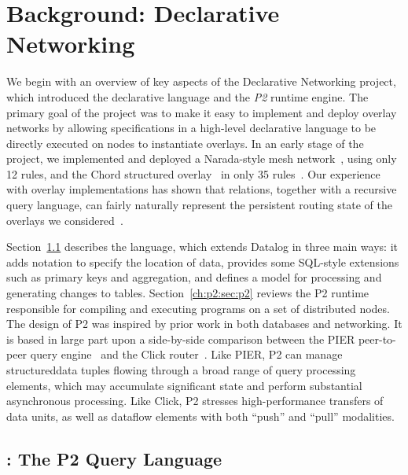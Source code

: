 \chapter[Background: Declarative Networking]{Background: Declarative Networking}
\label{ch:p2}

We begin with an overview of key aspects of the Declarative Networking project, which introduced the declarative language 
{\em \OVERLOG} and the {\em P2} runtime engine. The primary goal of the project was to make it easy to implement and 
deploy overlay networks by allowing specifications in a high-level declarative language to be directly executed on nodes 
to instantiate overlays. In an early stage of the project, we implemented and deployed a Narada-style mesh network~\cite{chu00case}, 
using only 12 rules, and the Chord structured overlay~\cite{chord} in only 35 rules~\cite{p2:sosp}. Our experience with overlay implementations has 
shown that relations, together with a recursive query language, can fairly naturally represent the persistent routing state of the overlays 
we considered~\cite{loo-sigmod06, p2:sosp}.

Section~\ref{ch:p2:sec:overlog} describes the \OVERLOG language, which extends Datalog in three main ways: 
it adds notation to specify the location of data, provides some SQL-style extensions such as primary keys and aggregation, 
and defines a model for processing and generating changes to tables. Section~\ref{ch:p2:sec:p2} reviews the P2 runtime 
responsible for compiling and executing \OVERLOG programs on a set of distributed nodes. The design of P2 was inspired 
by prior work in both databases and networking. It is based in large part upon a side-by-side comparison between the PIER 
peer-to-peer query engine~\cite{pier-cidr05} and the Click router~\cite{click-tocs}. Like PIER, P2 can manage structureddata 
tuples flowing through a broad range of query processing elements, which may accumulate significant state and perform substantial 
asynchronous processing.  Like Click, P2 stresses high-performance transfers of data units, as well as dataflow
elements with both ``push'' and ``pull'' modalities. 

\section{\OVERLOG: The P2 Query Language}
\label{ch:p2:sec:overlog}

